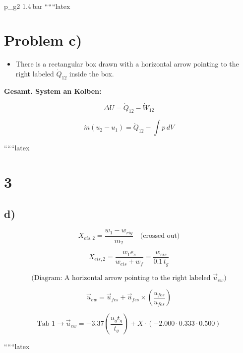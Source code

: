  \\
p_{g2}  1.4\,bar
``````latex


\section*{Problem c)}

\begin{itemize}
    \item There is a rectangular box drawn with a horizontal arrow pointing to the right labeled \( \dot{Q}_{12} \) inside the box.
\end{itemize}

\textbf{Gesamt. System an Kolben:}

\[
\Delta U = \dot{Q}_{12} - \dot{W}_{12}
\]

\[
\dot{m} (u_2 - u_1) = \dot{Q}_{12} - \int p \, dV
\]

``````latex


\section*{3}
\subsection*{d)}

\[
X_{eis,2} = \frac{w_1 - w_{rig}}{m_2} \quad \text{(crossed out)}
\]

\[
X_{eis,2} = \frac{w_{1} e_{s}}{w_{eis} + w_{f}} = \frac{w_{eis}}{0.1 \, t_{g}}
\]

\[
\text{(Diagram: A horizontal arrow pointing to the right labeled } \vec{u}_{ew})
\]

\[
\vec{u}_{ew} = \vec{u}_{fes} + \vec{u}_{fes} \times \left( \frac{u_{fes}}{u_{fes}} \right)
\]

\[
\text{Tab 1} \rightarrow \vec{u}_{ew} = -3.37 \left( \frac{u_{g} t_{g}}{t_{g}} \right) + X \cdot \left( -2.000 \cdot 0.333 \cdot 0.500 \right)
\]

``````latex


